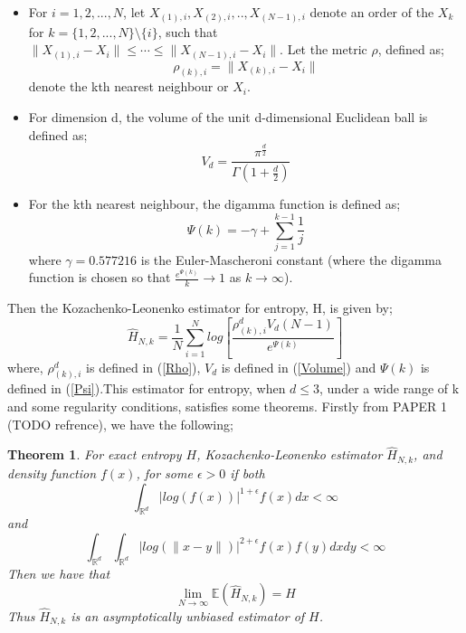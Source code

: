 \documentclass{article}
\newtheorem{theorem}{Theorem}
\begin{document}
\begin{itemize}

\item For $i = 1, 2, ..., N$, let $X_{(1), i}, X_{(2), i}, .., X_{(N-1), i}$ denote an order of the $X_{k}$ for $k = \{1, 2, ..., N\} \setminus \{i\}$, such that $\| X_{(1), i} - X_{i}\| \leq \cdots \leq \|  X_{(N-1), i} - X_{i}\| $. Let the metric $\rho$, defined as;
\begin{equation} \label{Rho}
\rho_{(k), i} = \| X_{(k), i} - X_{i}\|
\end{equation} denote the kth nearest neighbour or $X_{i}$.

\item  For dimension d, the volume of the unit d-dimensional Euclidean ball is defined as;
\begin{equation} \label{Volume}
V_{d} = \frac{\pi^\frac{d}{2}}{\Gamma(1 + \frac{d}{2})}
\end{equation}

\item For the kth nearest neighbour, the digamma function is defined as;
\begin{equation} \label{Psi}
\Psi(k) = -\gamma + \sum_{j=1}^{k-1} \frac{1}{j}
\end{equation}
where $\gamma = 0.577216$ is the Euler-Mascheroni constant (where the digamma function is chosen so that $\frac{e^{\Psi(k)}}{k}\to1$ as $k \to \infty$).

\end{itemize} Then the Kozachenko-Leonenko estimator for entropy, H, is given by;
\begin{equation} \label{KLest}
\hat{H}_{N, k} = \frac{1}{N} \sum_{i=1}^{N} log \left[ \frac{\rho_{(k),i}^{d} V_{d} (N-1)}{e^{\Psi(k)}} \right]
\end{equation} where, $\rho_{(k),i}^{d}$ is defined in (\ref{Rho}), $V_{d}$ is defined in (\ref{Volume}) and $\Psi(k)$ is defined in (\ref{Psi}).This estimator for entropy, when $d \leq 3$, under a wide range of k and some regularity conditions, satisfies some  theorems. Firstly from PAPER 1 (TODO refrence), we have the following;

\begin{theorem} \label{paper1_T1}
For exact entropy $H$, Kozachenko-Leonenko estimator $\hat{H}_{N,k}$, and density function $f(x)$, for some $\epsilon > 0$ if both
\begin{equation} \label{paper1_T1_eq1}
\int_{\mathbb{R}^{d}} | log(f(x))|^{1 + \epsilon} f(x) dx < \infty 
\end{equation}
and
\begin{equation} \label{paper1_T1_eq1}
\int_{\mathbb{R}^{d}} \int_{\mathbb{R}^{d}} | log(\|x-y\|)|^{2+ \epsilon} f(x) f(y) dx dy < \infty
\end{equation}
Then we have that 
\begin{equation} 
\lim_{N \to \infty} \mathbb{E} (\hat{H}_{N, k}) = H \nonumber
\end{equation}
Thus $\hat{H}_{N, k}$ is an asymptotically unbiased estimator of $H$.
\end{theorem}
\end{document}
